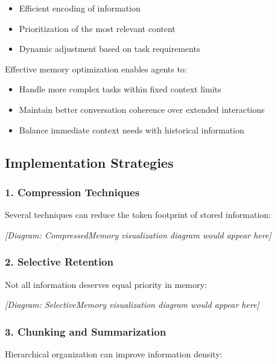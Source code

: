 \documentclass[11pt,oneside]{book}
\providecommand{\tightlist}{%
  \setlength{\itemsep}{0pt}\setlength{\parskip}{0pt}}
\begin{document}
\begin{itemize}
\tightlist
\item
  Efficient encoding of information
\item
  Prioritization of the most relevant content
\item
  Dynamic adjustment based on task requirements
\end{itemize}

Effective memory optimization enables agents to:

\begin{itemize}
\tightlist
\item
  Handle more complex tasks within fixed context limits
\item
  Maintain better conversation coherence over extended interactions
\item
  Balance immediate context needs with historical information
\end{itemize}

\subsection{Implementation Strategies}\label{implementation-strategies}

\subsubsection{1. Compression Techniques}\label{compression-techniques}

Several techniques can reduce the token footprint of stored information:

\emph{{[}Diagram: CompressedMemory visualization diagram would appear
here{]}}

\subsubsection{2. Selective Retention}\label{selective-retention}

Not all information deserves equal priority in memory:

\emph{{[}Diagram: SelectiveMemory visualization diagram would appear
here{]}}

\subsubsection{3. Chunking and
Summarization}\label{chunking-and-summarization}

Hierarchical organization can improve information density:
\end{document}
